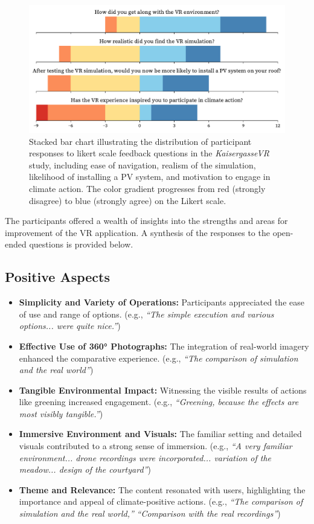 \documentclass[draft, final]{vutinfth} %
\begin{document}
\begin{figure}[h]
    \centering
    \includegraphics[width=\textwidth]{graphics/feedback-kaisergasse.pdf}
    \caption{Stacked bar chart illustrating the distribution of participant responses to likert scale feedback questions in the \textit{KaisergasseVR} study, including ease of navigation, realism of the simulation, likelihood of installing a PV system, and motivation to engage in climate action. The color gradient progresses from red (strongly disagree) to blue (strongly agree) on the Likert scale.}
    \label{fig:feedback-kaisergasse}
\end{figure}

The participants offered a wealth of insights into the strengths and areas for improvement of the VR application. A synthesis of the responses to the open-ended questions is provided below. 

\subsection{Positive Aspects}

\begin{itemize}
    \item \textbf{Simplicity and Variety of Operations:} Participants appreciated the ease of use and range of options. (e.g., \textit{``The simple execution and various options... were quite nice.''})
    \item \textbf{Effective Use of 360° Photographs:} The integration of real-world imagery enhanced the comparative experience. (e.g., \textit{``The comparison of simulation and the real world''})
    \item \textbf{Tangible Environmental Impact:} Witnessing the visible results of actions like greening increased engagement. (e.g., \textit{``Greening, because the effects are most visibly tangible.''})
    \item \textbf{Immersive Environment and Visuals:} The familiar setting and detailed visuals contributed to a strong sense of immersion. (e.g., \textit{``A very familiar environment... drone recordings were incorporated... variation of the meadow... design of the courtyard''}) 
    \item \textbf{Theme and Relevance:} The content resonated with users, highlighting the importance and appeal of climate-positive actions. (e.g., \textit{``The comparison of simulation and the real world,''} \textit{``Comparison with the real recordings''}) 
\end{itemize}
\end{document}
